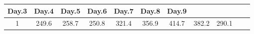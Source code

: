 \documentclass[]{article}
\theoremstyle{definition}
\theoremstyle{definition}
\theoremstyle{definition}
\theoremstyle{remark}
\begin{document}
\begin{longtable}[]{@{}ccccccccccc@{}}
\begin{minipage}[b]{0.06\columnwidth}
Day.3\strut
\end{minipage} & \begin{minipage}[b]{0.06\columnwidth}\centering\strut
Day.4\strut
\end{minipage} & \begin{minipage}[b]{0.06\columnwidth}\centering\strut
Day.5\strut
\end{minipage} & \begin{minipage}[b]{0.06\columnwidth}\centering\strut
Day.6\strut
\end{minipage} & \begin{minipage}[b]{0.06\columnwidth}\centering\strut
Day.7\strut
\end{minipage} & \begin{minipage}[b]{0.06\columnwidth}\centering\strut
Day.8\strut
\end{minipage} & \begin{minipage}[b]{0.06\columnwidth}\centering\strut
Day.9\strut
\end{minipage}\tabularnewline
\midrule
\endhead
\begin{minipage}[t]{0.08\columnwidth}\centering\strut
1\strut
\end{minipage} & \begin{minipage}[t]{0.06\columnwidth}\centering\strut
249.6\strut
\end{minipage} & \begin{minipage}[t]{0.06\columnwidth}\centering\strut
258.7\strut
\end{minipage} & \begin{minipage}[t]{0.06\columnwidth}\centering\strut
250.8\strut
\end{minipage} & \begin{minipage}[t]{0.06\columnwidth}\centering\strut
321.4\strut
\end{minipage} & \begin{minipage}[t]{0.06\columnwidth}\centering\strut
356.9\strut
\end{minipage} & \begin{minipage}[t]{0.06\columnwidth}\centering\strut
414.7\strut
\end{minipage} & \begin{minipage}[t]{0.06\columnwidth}\centering\strut
382.2\strut
\end{minipage} & \begin{minipage}[t]{0.06\columnwidth}\centering\strut
290.1\strut
\end{minipage} & \begin{minipage}[t]{0.06\columnwidth}\centering\strut

\end{minipage}
\end{longtable}
\end{document}

